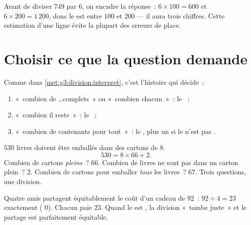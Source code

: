 \begin{example}\label{ex:g4:division:size}
Avant de diviser $749$ par $6$, on encadre la réponse~:
$6 \times 100 = 600$ et $6 \times 200 = 1\,200$, donc le 
est entre $100$ et $200$ --- il aura trois chiffres. Cette
estimation d'une ligne évite la plupart des erreurs de place.
\end{example}

\section{Choisir ce que la question demande}

\begin{method}\label{met:g4:division:interpret}
Comme dans \cref{met:g3:division:interpret}, c'est l'histoire qui
décide~:
\begin{enumerate}
  \item «~combien de \dots complets~» ou «~combien chacun~»~: le
        ~;
  \item «~combien il reste~»~: le ~;
  \item «~combien de contenants pour tout~»~: le , plus un
        si le  n'est pas .
\end{enumerate}
\end{method}

\begin{example}\label{ex:g4:division:problem}
$530$ livres doivent être emballés dans des cartons de $8$.
\[
530 = 8 \times 66 + 2 .
\]
Combien de cartons \emph{pleins}~? $66$. Combien de livres ne sont
pas dans un carton plein~? $2$. Combien de cartons pour emballer
\emph{tous} les livres~? $67$. Trois questions, une division.
\end{example}

\begin{example}\label{ex:g4:division:money}
Quatre amis partagent équitablement le coût d'un cadeau de $92$~:
$92 \div 4 = 23$ exactement ( $0$). Chacun paie $23$. Quand le
 est , la division «~tombe juste~» et le partage est
parfaitement équitable.
\end{example}

